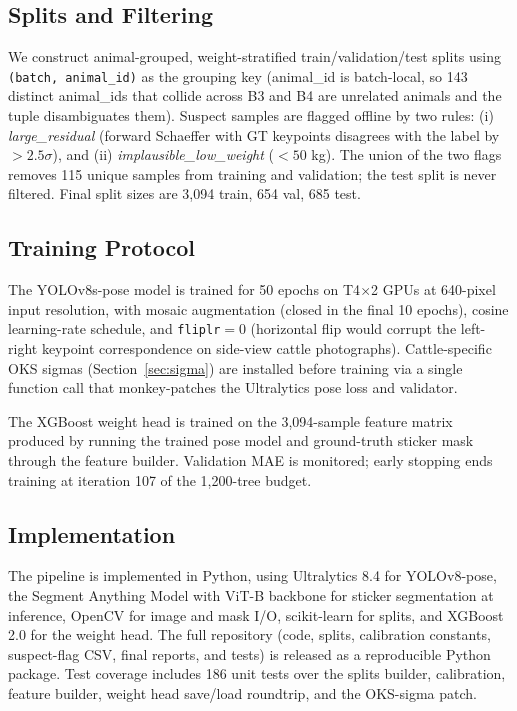 \documentclass[conference]{IEEEtran}
\begin{document}
\subsection{Splits and Filtering}

We construct animal-grouped, weight-stratified train/validation/test splits using \texttt{(batch, animal\_id)} as the grouping key (animal\_id is batch-local, so 143 distinct animal\_ids that collide across B3 and B4 are unrelated animals and the tuple disambiguates them). Suspect samples are flagged offline by two rules: (i) \textit{large\_residual} (forward Schaeffer with GT keypoints disagrees with the label by $>2.5\sigma$), and (ii) \textit{implausible\_low\_weight} ($<50$ kg). The union of the two flags removes 115 unique samples from training and validation; the test split is never filtered. Final split sizes are 3,094 train, 654 val, 685 test.

\subsection{Training Protocol}

The YOLOv8s-pose model is trained for 50 epochs on T4$\times$2 GPUs at 640-pixel input resolution, with mosaic augmentation (closed in the final 10 epochs), cosine learning-rate schedule, and \texttt{fliplr}$=0$ (horizontal flip would corrupt the left-right keypoint correspondence on side-view cattle photographs). Cattle-specific OKS sigmas (Section~\ref{sec:sigma}) are installed before training via a single function call that monkey-patches the Ultralytics pose loss and validator.

The XGBoost weight head is trained on the 3,094-sample feature matrix produced by running the trained pose model and ground-truth sticker mask through the feature builder. Validation MAE is monitored; early stopping ends training at iteration 107 of the 1,200-tree budget.

\subsection{Implementation}

The pipeline is implemented in Python, using Ultralytics 8.4 for YOLOv8-pose, the Segment Anything Model with ViT-B backbone for sticker segmentation at inference, OpenCV for image and mask I/O, scikit-learn for splits, and XGBoost 2.0 for the weight head. The full repository (code, splits, calibration constants, suspect-flag CSV, final reports, and tests) is released as a reproducible Python package. Test coverage includes 186 unit tests over the splits builder, calibration, feature builder, weight head save/load roundtrip, and the OKS-sigma patch.
\end{document}
